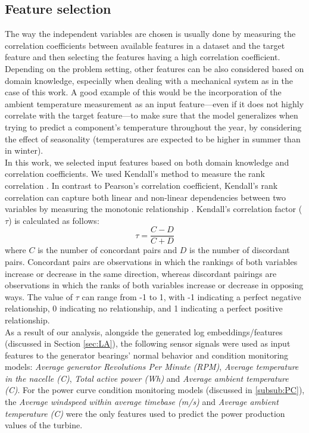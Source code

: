   \subsection{Feature selection}
  \label{sub:featselect}
    The way the independent variables are chosen is usually done by measuring the correlation coefficients between available features in a
    dataset and the target feature and then selecting the features having a high correlation coefficient. Depending on the problem setting, other features can be also considered 
    based on domain knowledge, especially when dealing with a mechanical system as in the case of this work. A good example of this would be the incorporation of 
    the ambient temperature measurement as an input feature---even if it does not highly correlate with the target feature---to make sure that the model generalizes when 
    trying to predict a component's temperature throughout the year, by considering the effect of seasonality 
    (temperatures are expected to be higher in summer than in winter).\\
    In this work, we selected input features based on both domain knowledge and correlation coefficients. We used Kendall's method to measure the rank correlation \cite{Kendall}.
    In contrast to Pearson's correlation coefficient, Kendall's rank correlation can capture both linear and non-linear dependencies between two variables by 
    measuring the monotonic relationship \cite{corr_comp}. Kendall's correlation factor ($\tau$) is calculated as follows:
    \begin{equation}
      \tau = \frac{C-D}{C+D}
    \end{equation}
    where $C$ is the number of concordant pairs and $D$ is the number of discordant pairs. Concordant pairs are observations in which the rankings of both variables increase or 
    decrease in the same direction, whereas discordant pairings are observations in which the ranks of both variables increase or decrease in opposing ways.
    The value of $\tau$ can range from -1 to 1, with -1 indicating a perfect negative relationship, 0 indicating no relationship, and 1 indicating a perfect positive relationship.\\
    As a result of our analysis, alongside the generated log embeddings/features (discussed in Section \ref{sec:LA}), the following sensor signals were used as 
    input features to the generator bearings' normal behavior and condition monitoring models: 
    \emph{Average generator Revolutions Per Minute (RPM)}, \emph{Average temperature in the nacelle (\degree C)}, \emph{Total active power (Wh)} and 
    \emph{Average ambient temperature (\degree C)}. For the power curve condition monitoring models (discussed in \ref{subsub:PC}), 
    the \emph{Average windspeed within average timebase (m/s)} and \emph{Average ambient temperature (\degree C)} were the only features used to predict the power production values of 
    the turbine.

